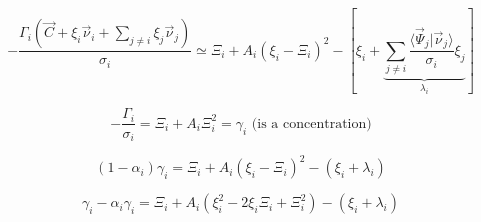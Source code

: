 \documentclass[aps,12pt]{revtex4}
\begin{document}
\begin{equation}
	-\dfrac{\Gamma_i\left(\vec{C}+\xi_i \vec{\nu}_i  + \sum_{j\not= i} \xi_j \vec{\nu}_j \right) }{\sigma_i}  \simeq
	 \Xi_i + A_i \left(\xi_i - \Xi_i\right)^2 - \left[ \xi_i + \underbrace{\sum_{j\not=i}  \dfrac{\langle \vec{\Psi}_j \vert \vec{\nu}_j \rangle}{\sigma_i} \xi_j}_{\lambda_i} \right]
\end{equation}

\begin{equation}
		-\dfrac{\Gamma_i}{\sigma_i} = \Xi_i + A_i \Xi_i^2 = \gamma_i \text{ (is a concentration)}
\end{equation}

\begin{equation}
	(1-\alpha_i) \gamma_i = \Xi_i + A_i \left(\xi_i - \Xi_i\right)^2 - (\xi_i+\lambda_i)
\end{equation}

\begin{equation}
	\gamma_i - \alpha_i \gamma_i = \Xi_i + A_i (\xi_i^2 - 2 \xi_i \Xi_i + \Xi_i^2) - (\xi_i+\lambda_i)
\end{equation}
\end{document}
